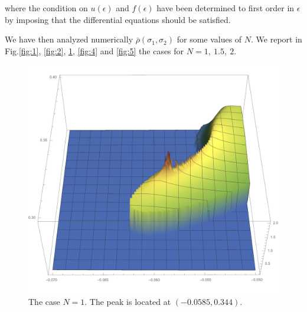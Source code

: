where the condition on $u(\epsilon)$ and $f(\epsilon)$ have been determined to first order in $\epsilon$ by imposing that the differential equations should be satisfied.

We have then analyzed numerically $\bar\rho(\sigma_1,\sigma_2)$ for some values of $N$.
We report in Fig.\ref{fig:1}, \ref{fig:2}, \ref{fig:3}, \ref{fig:4} and \ref{fig:5} the cases for $N=1,\ 1.5,\ 2$.



\begin{figure}
\begin{center}
\includegraphics[scale=0.5]{Immagini/spiked3N1.pdf}
\caption{The case $N=1$. The peak is located at $(-0.0585, 0.344)$.}
\label{fig:3}
\end{center}
\end{figure}


